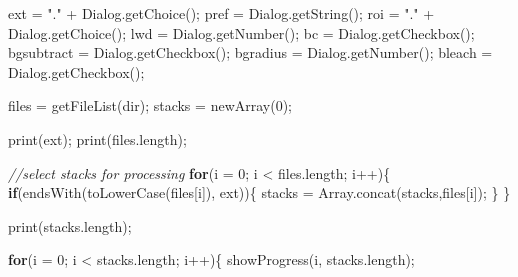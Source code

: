 \documentclass[
  12pt,
  a4paper,
]{book}
\newenvironment{Shaded}{}{}
\newcommand{\CommentTok}[1]{\textcolor[rgb]{0.38,0.63,0.69}{\textit{#1}}}
\newcommand{\ControlFlowTok}[1]{\textcolor[rgb]{0.00,0.44,0.13}{\textbf{#1}}}
\newcommand{\DecValTok}[1]{\textcolor[rgb]{0.25,0.63,0.44}{#1}}
\newcommand{\NormalTok}[1]{#1}
\newcommand{\OperatorTok}[1]{\textcolor[rgb]{0.40,0.40,0.40}{#1}}
\newcommand{\StringTok}[1]{\textcolor[rgb]{0.25,0.44,0.63}{#1}}
\begin{document}
\begin{Shaded}
\begin{Highlighting}[]
\NormalTok{ext }\OperatorTok{=} \StringTok{"."} \OperatorTok{+}\NormalTok{ Dialog}\OperatorTok{.}\NormalTok{getChoice}\OperatorTok{();}
\NormalTok{pref }\OperatorTok{=}\NormalTok{ Dialog}\OperatorTok{.}\NormalTok{getString}\OperatorTok{();}
\NormalTok{roi }\OperatorTok{=} \StringTok{"."} \OperatorTok{+}\NormalTok{ Dialog}\OperatorTok{.}\NormalTok{getChoice}\OperatorTok{();}
\NormalTok{lwd }\OperatorTok{=}\NormalTok{ Dialog}\OperatorTok{.}\NormalTok{getNumber}\OperatorTok{();}
\NormalTok{bc }\OperatorTok{=}\NormalTok{ Dialog}\OperatorTok{.}\NormalTok{getCheckbox}\OperatorTok{();}
\NormalTok{bgsubtract }\OperatorTok{=}\NormalTok{ Dialog}\OperatorTok{.}\NormalTok{getCheckbox}\OperatorTok{();}
\NormalTok{bgradius }\OperatorTok{=}\NormalTok{ Dialog}\OperatorTok{.}\NormalTok{getNumber}\OperatorTok{();}
\NormalTok{bleach }\OperatorTok{=}\NormalTok{ Dialog}\OperatorTok{.}\NormalTok{getCheckbox}\OperatorTok{();}

\NormalTok{files }\OperatorTok{=}\NormalTok{ getFileList}\OperatorTok{(}\NormalTok{dir}\OperatorTok{);}
\NormalTok{stacks }\OperatorTok{=}\NormalTok{ newArray}\OperatorTok{(}\DecValTok{0}\OperatorTok{);}

\NormalTok{print}\OperatorTok{(}\NormalTok{ext}\OperatorTok{);}
\NormalTok{print}\OperatorTok{(}\NormalTok{files}\OperatorTok{.}\NormalTok{length}\OperatorTok{);}

\CommentTok{//select stacks for processing}
\ControlFlowTok{for}\OperatorTok{(}\NormalTok{i }\OperatorTok{=} \DecValTok{0}\OperatorTok{;}\NormalTok{ i }\OperatorTok{\textless{}}\NormalTok{ files}\OperatorTok{.}\NormalTok{length}\OperatorTok{;}\NormalTok{ i}\OperatorTok{++)\{}
    \ControlFlowTok{if}\OperatorTok{(}\NormalTok{endsWith}\OperatorTok{(}\NormalTok{toLowerCase}\OperatorTok{(}\NormalTok{files}\OperatorTok{[}\NormalTok{i}\OperatorTok{]),}\NormalTok{ ext}\OperatorTok{))\{}
\NormalTok{        stacks }\OperatorTok{=}\NormalTok{ Array}\OperatorTok{.}\NormalTok{concat}\OperatorTok{(}\NormalTok{stacks}\OperatorTok{,}\NormalTok{files}\OperatorTok{[}\NormalTok{i}\OperatorTok{]);}
    \OperatorTok{\}}
\OperatorTok{\}}

\NormalTok{print}\OperatorTok{(}\NormalTok{stacks}\OperatorTok{.}\NormalTok{length}\OperatorTok{);}

\ControlFlowTok{for}\OperatorTok{(}\NormalTok{i }\OperatorTok{=} \DecValTok{0}\OperatorTok{;}\NormalTok{ i }\OperatorTok{\textless{}}\NormalTok{ stacks}\OperatorTok{.}\NormalTok{length}\OperatorTok{;}\NormalTok{ i}\OperatorTok{++)\{}
\NormalTok{    showProgress}\OperatorTok{(}\NormalTok{i}\OperatorTok{,}\NormalTok{ stacks}\OperatorTok{.}\NormalTok{length}\OperatorTok{);}


\end{Highlighting}
\end{Shaded}
\end{document}

